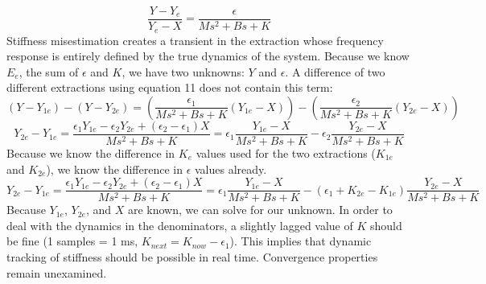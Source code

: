 \documentclass[10pt]{article}
\begin{document}
\begin{equation}
\frac{Y-Y_e}{Y_e-X}=\frac{\epsilon}{Ms^2+Bs+K}
\end{equation}
Stiffness misestimation creates a transient in the extraction whose frequency response is entirely defined by the true dynamics of the system. Because we know $E_e$, the sum of $\epsilon$ and $K$, we have two unknowns: $Y$ and $\epsilon$. A difference of two different extractions using equation 11 does not contain this term:
\begin{equation}
(Y-Y_{1e})-(Y-Y_{2e})=(\frac{\epsilon_1}{Ms^2+Bs+K}(Y_{1e}-X))-(\frac{\epsilon_2}{Ms^2+Bs+K}(Y_{2e}-X))
\end{equation}
\begin{equation}
Y_{2e}-Y_{1e}=\frac{\epsilon_1 Y_{1e}-\epsilon_2 Y_{2e}+(\epsilon_2-\epsilon_1)X}{Ms^2+Bs+K}=\epsilon_1 \frac{Y_{1e}-X}{Ms^2+Bs+K}- \epsilon_2 \frac{Y_{2e}-X}{Ms^2+Bs+K}
\end{equation}
Because we know the difference in $K_e$ values used for the two extractions ($K_{1e}$ and $K_{2e}$), we know the difference in $\epsilon$ values already.
\begin{equation}
Y_{2e}-Y_{1e}=\frac{\epsilon_1 Y_{1e}-\epsilon_2 Y_{2e}+(\epsilon_2-\epsilon_1)X}{Ms^2+Bs+K}=\epsilon_1 \frac{Y_{1e}-X}{Ms^2+Bs+K}- (\epsilon_1+K_{2e}-K_{1e}) \frac{Y_{2e}-X}{Ms^2+Bs+K}
\end{equation}
Because $Y_{1e}$, $Y_{2e}$, and $X$ are known, we can solve for our unknown. In order to deal with the dynamics in the denominators, a slightly lagged value of $K$ should be fine (1 samples = 1 ms, $K_{next}=K_{now}-\epsilon_1$). This implies that dynamic tracking of stiffness should be possible in real time. Convergence properties remain unexamined.
\end{document}
